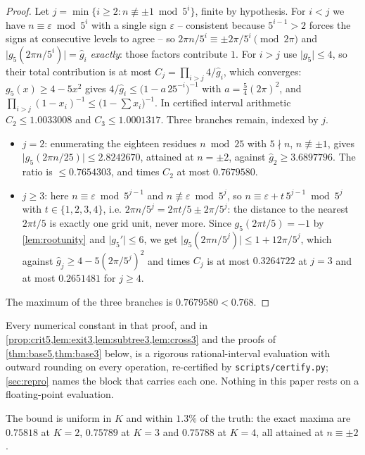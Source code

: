 \documentclass[11pt]{amsart}
\theoremstyle{definition}
\theoremstyle{remark}
\begin{document}
\begin{proof}
Let $j = \min\{i \ge 2 : n \not\equiv \pm 1 \bmod 5^i\}$, finite by hypothesis. For $i < j$ we have $n \equiv \varepsilon \bmod 5^i$ with a single sign $\varepsilon$ -- consistent because $5^{i-1} > 2$ forces the signs at consecutive levels to agree -- so $2\pi n/5^i \equiv \pm 2\pi/5^i \pmod{2\pi}$ and $\lvert g_5(2\pi n/5^i)\rvert = \hat g_i$ \emph{exactly}: those factors contribute $1$. For $i > j$ use $\lvert g_5 \rvert \le 4$, so their total contribution is at most $C_j = \prod_{i>j}4/\hat g_i$, which converges: $g_5(x) \ge 4 - 5x^2$ gives $4/\hat g_i \le \bigl(1 - a\,25^{-i}\bigr)^{-1}$ with $a = \tfrac54(2\pi)^2$, and $\prod_{i>j}(1-x_i)^{-1} \le \bigl(1 - \sum x_i\bigr)^{-1}$. In certified interval arithmetic $C_2 \le 1.0033008$ and $C_3 \le 1.0001317$. Three branches remain, indexed by $j$.
\begin{itemize}
\item $j = 2$: enumerating the eighteen residues $n \bmod 25$ with $5 \nmid n$, $n \not\equiv \pm1$, gives $\lvert g_5(2\pi n/25)\rvert \le 2.8242670$, attained at $n = \pm 2$, against $\hat g_2 \ge 3.6897796$. The ratio is $\le 0.7654303$, and times $C_2$ at most $0.7679580$.
\item $j \ge 3$: here $n \equiv \varepsilon \bmod 5^{j-1}$ and $n \not\equiv \varepsilon \bmod 5^j$, so $n \equiv \varepsilon + t\,5^{j-1} \bmod 5^j$ with $t \in \{1,2,3,4\}$, i.e. $2\pi n/5^j = 2\pi t/5 \pm 2\pi/5^j$: the distance to the nearest $2\pi t/5$ is exactly one grid unit, never more. Since $g_5(2\pi t/5) = -1$ by \cref{lem:rootunity} and $\lvert g_5'\rvert \le 6$, we get $\lvert g_5(2\pi n/5^j)\rvert \le 1 + 12\pi/5^j$, which against $\hat g_j \ge 4 - 5(2\pi/5^j)^2$ and times $C_j$ is at most $0.3264722$ at $j = 3$ and at most $0.2651481$ for $j \ge 4$.
\end{itemize}
The maximum of the three branches is $0.7679580 < 0.768$.
\end{proof}

Every numerical constant in that proof, and in \cref{prop:crit5,lem:exit3,lem:subtree3,lem:cross3} and the proofs of \cref{thm:base5,thm:base3} below, is a rigorous rational-interval evaluation with outward rounding on every operation, re-certified by \texttt{scripts/certify.py}; \cref{sec:repro} names the block that carries each one. Nothing in this paper rests on a floating-point evaluation.

The bound is uniform in $K$ and within $1.3\%$ of the truth: the exact maxima are $0.75818$ at $K = 2$, $0.75789$ at $K = 3$ and $0.75788$ at $K = 4$, all attained at $n \equiv \pm 2$.
\end{document}
